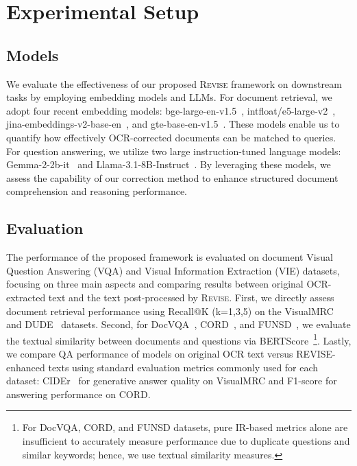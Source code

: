 \section{Experimental Setup}
\subsection{Models}



We evaluate the effectiveness of our proposed \textsc{Revise} framework on downstream tasks by employing embedding models and LLMs. For document retrieval, we adopt four recent embedding models: bge-large-en-v1.5~\cite{bge_embedding}, intfloat/e5-large-v2~\cite{wang2022text}, jina-embeddings-v2-base-en~\cite{gunther2023jina}, and gte-base-en-v1.5~\cite{li2023gte}. These models enable us to quantify how effectively OCR-corrected documents can be matched to queries. For question answering, we utilize two large instruction-tuned language models: Gemma-2-2b-it~\cite{gemma_2024} and Llama-3.1-8B-Instruct~\cite{meta_llama_2024}. By leveraging these models, we assess the capability of our correction method to enhance structured document comprehension and reasoning performance.






\subsection{Evaluation}



The performance of the proposed framework is evaluated on document Visual Question Answering (VQA) and Visual Information Extraction (VIE) datasets, focusing on three main aspects and comparing results between original OCR-extracted text and the text post-processed by \textsc{Revise}. First, we directly assess document retrieval performance using Recall@K (k=1,3,5) on the VisualMRC~\cite{VisualMRC2021} and DUDE~\cite{vanlandeghem2023documentunderstandingdatasetevaluation} datasets. Second, for DocVQA~\cite{mathew2021docvqa}, CORD~\cite{park2019cord}, and FUNSD~\cite{jaume2019funsddatasetformunderstanding}, we evaluate the textual similarity between documents and questions via BERTScore~\cite{zhang2020bertscoreevaluatingtextgeneration}\footnote{For DocVQA, CORD, and FUNSD datasets, pure IR-based metrics alone are insufficient to accurately measure performance due to duplicate questions and similar keywords; hence, we use textual similarity measures.}. Lastly, we compare QA performance of models on original OCR text versus REVISE-enhanced texts using standard evaluation metrics commonly used for each dataset: CIDEr~\cite{vedantam2014cider} for generative answer quality on VisualMRC and F1-score for answering performance on CORD.








